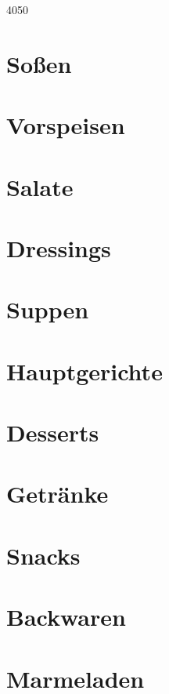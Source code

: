 \documentclass[11pt, a4paper, twoside]{book} %
\makeatletter
\newcommand\HUGE{\@setfontsize\Huge{40}{50}}
\makeatother
\begin{document}
\renewcommand{\indexname}{Stichwortverzeichnis}

\justify
\setlength\parindent{0pt}

\thispagestyle{empty}
\vspace*{3cm}
\begin{center}
{\HUGE{\textsc{}}}
\vspace{2cm}
\end{center}
\vspace{3cm}
\newpage

\tableofcontents


\chapter{So\ss{}en}
\thispagestyle{empty}

\chapter{Vorspeisen}
\thispagestyle{empty}

\chapter{Salate}
\thispagestyle{empty}

\chapter{Dressings}
\thispagestyle{empty}

\chapter{Suppen}
\thispagestyle{empty}

\chapter{Hauptgerichte}
\thispagestyle{empty}

\chapter{Desserts}
\thispagestyle{empty}

\chapter{Getr\"anke}
\thispagestyle{empty}

\chapter{Snacks}
\thispagestyle{empty}

\chapter{Backwaren}
\thispagestyle{empty}

\chapter{Marmeladen}
\thispagestyle{empty}


\cleardoublepage
{}
\printindex
\end{document}
